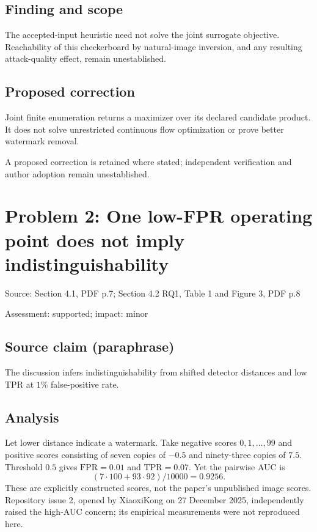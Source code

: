 \documentclass[11pt]{article}
\begin{document}
\subsection*{Finding and scope}

The accepted-input heuristic need not solve the joint surrogate objective. Reachability of this checkerboard by natural-image inversion, and any resulting attack-quality effect, remain unestablished.

\subsection*{Proposed correction}

Joint finite enumeration returns a maximizer over its declared candidate product. It does not solve unrestricted continuous flow optimization or prove better watermark removal.

A proposed correction is retained where stated; independent verification and author adoption remain unestablished.

\section*{Problem 2: One low-FPR operating point does not imply indistinguishability}

Source: Section 4.1, PDF p.7; Section 4.2 RQ1, Table 1 and Figure 3, PDF p.8

Assessment: supported; impact: minor

\subsection*{Source claim (paraphrase)}

The discussion infers indistinguishability from shifted detector distances and low \(\mathrm{TPR}\) at \(1\%\) false-positive rate.

\subsection*{Analysis}

Let lower distance indicate a watermark. Take negative scores \(0,1,\ldots,99\) and positive scores consisting of seven copies of \(-0.5\) and ninety-three copies of \(7.5\). Threshold \(0.5\) gives \(\mathrm{FPR}=0.01\) and \(\mathrm{TPR}=0.07\). Yet the pairwise AUC is \[(7\cdot100+93\cdot92)/10000=0.9256.\] These are explicitly constructed scores, not the paper’s unpublished image scores. Repository issue 2, opened by XiaoxiKong on 27 December 2025, independently raised the high-AUC concern; its empirical measurements were not reproduced here.
\end{document}
